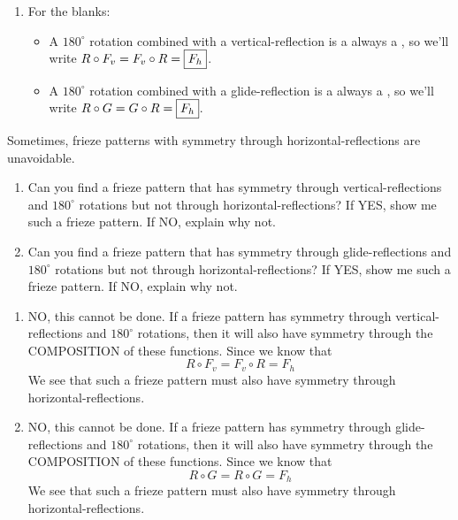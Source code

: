 \documentclass[noauthor,nooutcomes,hints,handout]{../ximera}
\begin{document}
\begin{question}
\begin{freeResponse}
\begin{enumerate}
\begin{center}
      \end{center}
    \item For the blanks:
      \begin{itemize}
      \item  A $180^\circ$ rotation combined with a vertical-reflection
        is a always a , so we'll
        write $R\circ F_v = F_v \circ R = \fbox{$F_h$}$.
      \item A $180^\circ$ rotation combined with a glide-reflection
        is a always a , so we'll
        write $R\circ G = G \circ R = \fbox{$F_h$}$.
      \end{itemize}
    \end{enumerate}
  \end{freeResponse}
\end{question}
\mynewpage








\begin{question}
  Sometimes, frieze patterns with symmetry through
  horizontal-reflections are unavoidable.
  \begin{enumerate}
  \item Can you find a frieze pattern that has symmetry through
    vertical-reflections and $180^\circ$ rotations but not through
    horizontal-reflections? If YES, show me such a frieze pattern. If
    NO, explain why not.    
  \item
    Can you find a frieze pattern that has symmetry through
    glide-reflections and $180^\circ$ rotations but not through
    horizontal-reflections? If YES, show me such a frieze pattern. If
    NO, explain why not.
  \end{enumerate}
  \begin{freeResponse}
    \begin{enumerate}
    \item NO, this cannot be done. If a frieze pattern has symmetry
      through vertical-reflections and $180^\circ$ rotations, then it
      will also have symmetry through the COMPOSITION of these
      functions. Since we know that
      \[
      R\circ F_v = F_v \circ R = F_h
      \]
      We see that such a frieze pattern must also have symmetry
      through horizontal-reflections.
    \item NO, this cannot be done.  If a frieze pattern has symmetry
      through glide-reflections and $180^\circ$ rotations, then it
      will also have symmetry through the COMPOSITION of these
      functions. Since we know that
      \[
      R\circ G = R\circ G = F_h
      \]
      We see that such a frieze pattern must also have symmetry
      through horizontal-reflections.
    \end{enumerate}
  \end{freeResponse}
\end{question}
\end{document}
